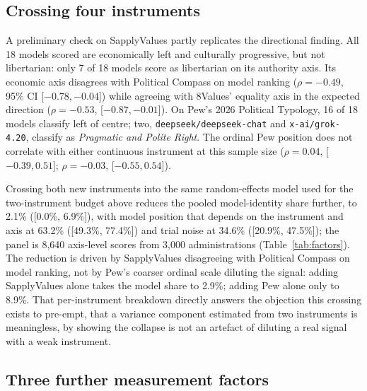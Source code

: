 \documentclass[12pt]{article}
\begin{document}
\subsection{Crossing four instruments}
\label{sec:four-instrument}

A preliminary check on SapplyValues partly replicates the directional
finding. All 18 models scored are economically left and culturally
progressive, but not libertarian: only 7 of 18 models score as
libertarian on its authority axis. Its economic axis disagrees with
Political Compass on model ranking ($\rho=-0.49$, 95\% CI [$-0.78,-0.04$])
while agreeing with 8Values' equality axis in the expected direction
($\rho=-0.53$, [$-0.87,-0.01$]). On Pew's 2026 Political Typology, 16 of 18
models classify left of centre; two, \texttt{deepseek/deepseek-chat} and
\texttt{x-ai/grok-4.20}, classify as \emph{Pragmatic and Polite Right}. The
ordinal Pew position does not correlate with either continuous instrument
at this sample size ($\rho=0.04$, [$-0.39,0.51]$; $\rho=-0.03$,
[$-0.55,0.54]$).

Crossing both new instruments into the same random-effects model used for
the two-instrument budget above reduces the pooled model-identity share
further, to 2.1\% ([0.0\%, 6.9\%]), with model position that depends on the
instrument and axis at 63.2\% ([49.3\%, 77.4\%]) and trial noise at 34.6\%
([20.9\%, 47.5\%]); the panel is 8,640 axis-level scores from 3,000
administrations (Table~\ref{tab:factors}). The reduction is driven by
SapplyValues disagreeing with Political Compass on model ranking, not by
Pew's coarser ordinal scale diluting the signal: adding SapplyValues alone
takes the model share to 2.9\%; adding Pew alone only to 8.9\%. That
per-instrument breakdown directly answers the objection this crossing
exists to pre-empt, that a variance component estimated from two
instruments is meaningless, by showing the collapse is not an artefact of
diluting a real signal with a weak instrument.

\subsection{Three further measurement factors}
\label{sec:three-factors}
\end{document}

